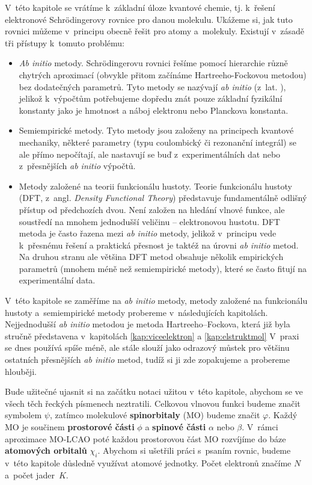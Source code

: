 V~této kapitole se vrátíme k~základní úloze kvantové chemie, tj. k~řešení elektronové Schr\"{o}dingerovy rovnice pro danou molekulu. Ukážeme si, jak tuto rovnici můžeme v~principu obecně řešit pro atomy a~molekuly.  Existují v~zásadě tři přístupy k~tomuto problému:

\begin{itemize}

\item \textit{Ab initio} metody.  Schr\"{o}dingerovu  rovnici řešíme pomocí hierarchie různě chytrých aproximací (obvykle přitom začínáme Hartreeho-Fockovou metodou) bez dodatečných parametrů. Tyto metody se nazývají \textit{ab initio} (z~lat. ), jelikož k~výpočtům potřebujeme dopředu znát pouze základní fyzikální konstanty jako je hmotnost a náboj elektronu nebo Planckova konstanta. 

\item Semiempirické metody. Tyto metody jsou založeny na principech kvantové mechaniky, některé parametry (typu coulombický či rezonanční integrál) se ale přímo nepočítají, ale nastavují se buď z~experimentálních dat nebo z~přesnějších \textit{ab initio} výpočtů.

\item Metody založené na teorii funkcionálu hustoty.  Teorie funkcionálu hustoty (DFT, z~angl. \textit{Density Functional Theory}) představuje fundamentálně odlišný přístup od předchozích dvou. Není založen na hledání vlnové funkce, ale soustředí na mnohem jednodušší veličinu -- elektronovou hustotu. DFT metoda je často řazena mezi \textit{ab initio} metody, jelikož v~principu vede k~přesnému řešení a praktická přesnost je taktéž na úrovni \textit{ab initio} metod. Na druhou stranu ale většina DFT metod obsahuje několik empirických parametrů (mnohem méně než semiempirické metody), které se často fitují na experimentální data.

\end{itemize}

V~této kapitole se zaměříme na \textit{ab initio} metody, metody založené na funkcionálu hustoty a~semiempirické metody probereme v~následujících kapitolách. Nejjednodušší \textit{ab initio} metodou je metoda Hartreeho--Fockova, která již byla stručně představena v~kapitolách \ref{kap:viceelektron} a \ref{kap:elstruktmol}
V~praxi se dnes používá spíše méně, ale stále slouží jako odrazový můstek pro většinu ostatních přesnějších \textit{ab initio} metod, tudíž si ji zde zopakujeme a probereme hlouběji.

Bude užitečné ujasnit si na začátku notaci užitou v~této kapitole, abychom se ve všech těch řeckých písmenech neztratili. Celkovou vlnovou funkci budeme značit symbolem $\psi$,  zatímco molekulové \textbf{spinorbitaly} (MO) budeme značit $\varphi$. Každý MO je součinem \textbf{prostorové části} $\phi$ a \textbf{spinové části} $\alpha$ nebo $\beta$. V~rámci aproximace MO-LCAO poté každou prostorovou část MO rozvíjíme do báze \textbf{atomových orbitalů} $\chi_i$. Abychom si ušetřili práci s~psaním rovnic, budeme v~této kapitole důsledně využívat atomové jednotky. Počet elektronů značíme $N$ a~počet jader~$K$.

